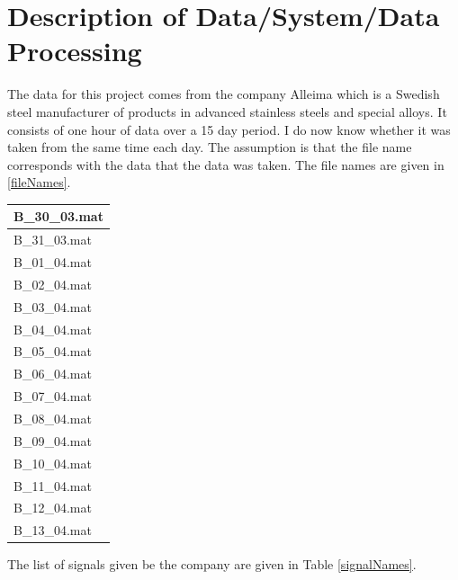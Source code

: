 \documentclass{article}
\begin{document}
\section{Description of Data/System/Data Processing}
The data for this project comes from the company Alleima which is a Swedish steel manufacturer of products in advanced stainless steels and special alloys.
It consists of one hour of data over a 15 day period. I do now know whether it was taken from the same time each day. The assumption is that the file name corresponds with the data that the data was taken.
The file names are given in \ref{fileNames}.
\begin{center}
\begin{tabular}{ |l| } 
 \hline
 B\_30\_03.mat \\
 \hline 
 B\_31\_03.mat \\
 \hline 
 B\_01\_04.mat \\
 \hline 
 B\_02\_04.mat \\
 \hline
 B\_03\_04.mat \\
 \hline 
 B\_04\_04.mat \\
 \hline 
 B\_05\_04.mat \\
 \hline
 B\_06\_04.mat \\
 \hline 
 B\_07\_04.mat \\
 \hline 
 B\_08\_04.mat \\
 \hline 
 B\_09\_04.mat \\
 \hline 
 B\_10\_04.mat \\
 \hline
 B\_11\_04.mat \\
 \hline 
 B\_12\_04.mat \\
 \hline
 B\_13\_04.mat \\
 \hline
\end{tabular}
\label{fileNames}
\end{center}
The list of signals given be the company are given in Table \ref{signalNames}.
\end{document}
